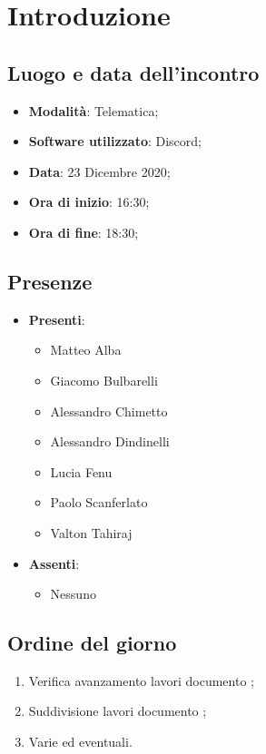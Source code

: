 \documentclass[]{article}
\begin{document}
	
	
	
	\newpage
	
	\section{Introduzione}
		\subsection{Luogo e data dell'incontro}
		\begin{itemize}
			\item \textbf{Modalità}: Telematica;
			\item \textbf{Software utilizzato}: Discord;
			\item \textbf{Data}: 23 Dicembre 2020;
			\item \textbf{Ora di inizio}: 16:30;
			\item \textbf{Ora di fine}: 18:30;
		\end{itemize}

		\subsection{Presenze}
		\begin{itemize}
			\item \textbf{Presenti}:
		\begin{itemize}
			\item Matteo Alba
			\item Giacomo Bulbarelli
			\item Alessandro Chimetto
			\item Alessandro Dindinelli
			\item Lucia Fenu
			\item Paolo Scanferlato
			\item Valton Tahiraj
		\end{itemize}
			\item \textbf{Assenti}:
			\begin{itemize}
				\item Nessuno
			\end{itemize}
		\end{itemize}
	
		\subsection{Ordine del giorno}
		\begin{enumerate}
			\item Verifica avanzamento lavori documento ;
			\item Suddivisione lavori documento ;
			\item Varie ed eventuali.
		\end{enumerate}
	
\end{document}

